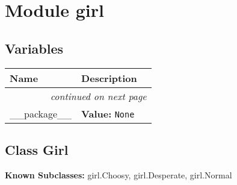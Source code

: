 %
%
%


\section{Module girl}

    \label{girl}


  \subsection{Variables}

    \vspace{-1cm}
\hspace{\varindent}\begin{longtable}{|p{\varnamewidth}|p{\vardescrwidth}|l}
\cline{1-2}
\cline{1-2} \centering \textbf{Name} & \centering \textbf{Description}& \\
\cline{1-2}
\endhead\cline{1-2}\multicolumn{3}{r}{\small\textit{continued on next page}}\\\endfoot\cline{1-2}
\endlastfoot\raggedright \_\-\_\-p\-a\-c\-k\-a\-g\-e\-\_\-\_\- & \raggedright \textbf{Value:} 
{\tt None}&\\
\cline{1-2}
\end{longtable}



\subsection{Class Girl}

    \label{girl:Girl}
\textbf{Known Subclasses:}
girl.Choosy,
    girl.Desperate,
    girl.Normal


